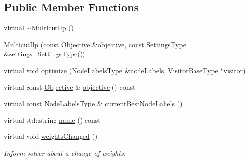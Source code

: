 \subsection*{Public Member Functions}
\begin{DoxyCompactItemize}
\item 
virtual \hyperlink{classnifty_1_1graph_1_1optimization_1_1multicut_1_1MulticutIlp_a1da47db8d4c0b87a966d958c21eebc9c}{$\sim$\+Multicut\+Ilp} ()
\item 
\hyperlink{classnifty_1_1graph_1_1optimization_1_1multicut_1_1MulticutIlp_a1a34b76f0067a17bda323c9a3c09b5b8}{Multicut\+Ilp} (const \hyperlink{classnifty_1_1graph_1_1optimization_1_1multicut_1_1MulticutIlp_a1c9fe5899608fc9c8e32bde6648c8278}{Objective} \&\hyperlink{classnifty_1_1graph_1_1optimization_1_1multicut_1_1MulticutIlp_a4d75fe18138dae4c11a3a0bd6095d23b}{objective}, const \hyperlink{structnifty_1_1graph_1_1optimization_1_1multicut_1_1MulticutIlp_1_1SettingsType}{Settings\+Type} \&settings=\hyperlink{structnifty_1_1graph_1_1optimization_1_1multicut_1_1MulticutIlp_1_1SettingsType}{Settings\+Type}())
\item 
virtual void \hyperlink{classnifty_1_1graph_1_1optimization_1_1multicut_1_1MulticutIlp_a13584c239b835498e262e8fdfd9fac0c}{optimize} (\hyperlink{classnifty_1_1graph_1_1optimization_1_1multicut_1_1MulticutIlp_acc09a2ea6cee89d05a3edf7f6681431c}{Node\+Labels\+Type} \&node\+Labels, \hyperlink{classnifty_1_1graph_1_1optimization_1_1multicut_1_1MulticutIlp_a9eefe7c387f863ed499bb53854164d9a}{Visitor\+Base\+Type} $\ast$visitor)
\item 
virtual const \hyperlink{classnifty_1_1graph_1_1optimization_1_1multicut_1_1MulticutIlp_a1c9fe5899608fc9c8e32bde6648c8278}{Objective} \& \hyperlink{classnifty_1_1graph_1_1optimization_1_1multicut_1_1MulticutIlp_a4d75fe18138dae4c11a3a0bd6095d23b}{objective} () const 
\item 
virtual const \hyperlink{classnifty_1_1graph_1_1optimization_1_1multicut_1_1MulticutIlp_acc09a2ea6cee89d05a3edf7f6681431c}{Node\+Labels\+Type} \& \hyperlink{classnifty_1_1graph_1_1optimization_1_1multicut_1_1MulticutIlp_a6e93b945a78784f1fccf4bdc0061553e}{current\+Best\+Node\+Labels} ()
\item 
virtual std\+::string \hyperlink{classnifty_1_1graph_1_1optimization_1_1multicut_1_1MulticutIlp_a5093a9286730b9deed24a200cc8c035b}{name} () const 
\item 
virtual void \hyperlink{classnifty_1_1graph_1_1optimization_1_1multicut_1_1MulticutIlp_a741353b34b8997acb8eb502608a8b1ec}{weights\+Changed} ()
\begin{DoxyCompactList}\small\item\em Inform solver about a change of weights. \end{DoxyCompactList}\end{DoxyCompactItemize}


